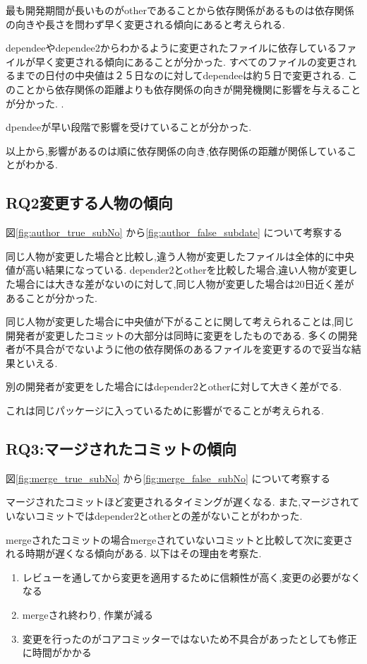 \documentclass[submit,ses,noauthor]{ipsj} %
\begin{document}
最も開発期間が長いものがotherであることから依存関係があるものは依存関係の向きや長さを問わず早く変更される傾向にあると考えられる.


dependeeやdependee2からわかるように変更されたファイルに依存しているファイルが早く変更される傾向にあることが分かった.
すべてのファイルの変更されるまでの日付の中央値は２５日なのに対してdependeeは約５日で変更される.
このことから依存関係の距離よりも依存関係の向きが開発機関に影響を与えることが分かった.
.

dpendeeが早い段階で影響を受けていることが分かった.


以上から,影響があるのは順に依存関係の向き,依存関係の距離が関係していることがわかる.



\subsection{RQ2変更する人物の傾向}
図\ref{fig:author_true_subNo} から\ref{fig:author_false_subdate} について考察する

同じ人物が変更した場合と比較し,違う人物が変更したファイルは全体的に中央値が高い結果になっている.
depender2とotherを比較した場合,違い人物が変更した場合には大きな差がないのに対して,同じ人物が変更した場合は20日近く差があることが分かった.

同じ人物が変更した場合に中央値が下がることに関して考えられることは,同じ開発者が変更したコミットの大部分は同時に変更をしたものである.
多くの開発者が不具合がでないように他の依存関係のあるファイルを変更するので妥当な結果といえる.

別の開発者が変更をした場合にはdepender2とotherに対して大きく差がでる.

これは同じパッケージに入っているために影響がでることが考えられる.


\subsection{RQ3:マージされたコミットの傾向}
図\ref{fig:merge_true_subNo} から\ref{fig:merge_false_subNo} について考察する

マージされたコミットほど変更されるタイミングが遅くなる.
また,マージされていないコミットではdepender2とotherとの差がないことがわかった.



mergeされたコミットの場合mergeされていないコミットと比較して次に変更される時期が遅くなる傾向がある.
以下はその理由を考察た.
\begin{enumerate}
\item レビューを通してから変更を適用するために信頼性が高く,変更の必要がなくなる
\item mergeされ終わり, 作業が減る
\item 変更を行ったのがコアコミッターではないため不具合があったとしても修正に時間がかかる
\end{enumerate}
\end{document}
